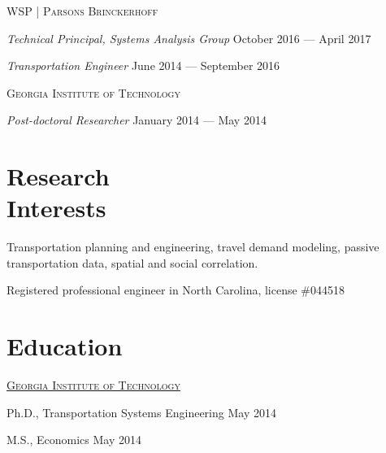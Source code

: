 \documentclass[margin,line]{res}
\newcommand{\acc}{\scshape }
\newenvironment{list1}{
  \begin{list}{\ding{113}}{%
      \setlength{\itemsep}{0in}
      \setlength{\parsep}{0in} \setlength{\parskip}{0in}
      \setlength{\topsep}{0in} \setlength{\partopsep}{0in}
      \setlength{\leftmargin}{0.17in}}}{\end{list}}
\newenvironment{list2}{
  \begin{list}{$\bullet$}{%
      \setlength{\itemsep}{0in}
      \setlength{\parsep}{0in} \setlength{\parskip}{0in}
      \setlength{\topsep}{0in} \setlength{\partopsep}{0in}
      \setlength{\leftmargin}{0.2in}}}{\end{list}}
\begin{document}
\begin{resume}
{\acc{WSP | Parsons Brinckerhoff}} 

\begin{list1}
  \item[] \textit{Technical Principal, Systems Analysis Group} \hfill {October 2016 --- April 2017}
  \item[] \textit{Transportation Engineer} \hfill{June 2014 --- September 2016}
\end{list1}

{\acc{Georgia Institute of Technology}}

\begin{list1}
\item[]\textit{Post-doctoral Researcher} \hfill {January 2014 --- May 2014}\\
\end{list1}


\vspace{-.4cm}
\section{Research\\ Interests}
Transportation planning and engineering, travel demand modeling,
passive transportation data, spatial and social correlation.

Registered professional engineer in North Carolina, license \#044518

\section{Education}
\href{http://www.gatech.edu}{\acc Georgia Institute of Technology}
\\
	\vspace*{-.1in}
	\begin{list1}
	\item[] Ph.D., Transportation Systems Engineering \hfill{May 2014} 

	\vspace*{.05in}
	\item[]M.S., Economics \hfill{May 2014}
	\end{list1}


\end{resume}
\end{document}
